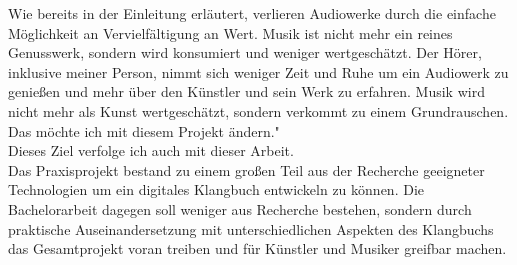 Wie bereits in der Einleitung erläutert, verlieren Audiowerke durch die einfache Möglichkeit an Vervielfältigung an Wert. Musik ist nicht mehr ein reines Genusswerk, sondern wird konsumiert und weniger wertgeschätzt. Der Hörer, inklusive meiner Person, nimmt sich weniger Zeit und Ruhe um ein Audiowerk zu genießen und mehr über den Künstler und sein Werk zu erfahren. Musik wird nicht mehr als Kunst wertgeschätzt, sondern verkommt zu einem Grundrauschen. Das möchte ich mit diesem Projekt ändern."\cite{pp}\\

Dieses Ziel verfolge ich auch mit dieser Arbeit.\\

Das Praxisprojekt bestand zu einem großen Teil aus der Recherche geeigneter Technologien um ein digitales Klangbuch entwickeln zu können. Die Bachelorarbeit dagegen soll weniger aus Recherche bestehen, sondern durch praktische Auseinandersetzung mit unterschiedlichen Aspekten des Klangbuchs das Gesamtprojekt voran treiben und für Künstler und Musiker greifbar machen.










 







